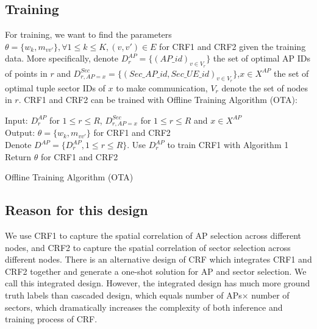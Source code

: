 \documentclass[conference]{IEEEtran}
\begin{document}
\subsection{Training}
For training, we want to find the parameters $\theta = \{w_{k},m_{vv'}\},\forall 1\leq k\leq K, (v,v')\in E$ for CRF1 and CRF2 given the training data. More specifically, denote $D^{AP}_{r}=\{(AP\_id)_{v\in V_{r}}\}$ the set of optimal AP IDs of points in $r$ and $D^{Sec}_{r,AP=x}=\{(Sec\_AP\_id, Sec\_UE\_id)_{v\in V_{r}}\}$,$x\in X^{AP}$ the set of optimal tuple sector IDs of $x$ to make communication, $V_{r}$ denote the set of nodes in $r$. CRF1 and CRF2 can be trained with Offline Training Algorithm (OTA):
\begin{algorithm}[H]
	Input:  $D^{AP}_{r}$ for $1\leq r\leq R$, $D^{Sec}_{r,AP=x}$ for $1\leq r\leq R$ and $x\in X^{AP}$\\
	Output: $\theta = \{w_{k},m_{vv'}\}$ for CRF1 and CRF2\\
    Denote $D^{AP}=\{D^{AP}_{r},1\leq r\leq R\}$. Use $D^{AP}_{r}$ to train CRF1 with Algorithm 1\\
    Return $\theta$ for CRF1 and CRF2
	\caption{Offline Training Algorithm (OTA)}
\end{algorithm}
\subsection{Reason for this design}
We use CRF1 to capture the spatial correlation of AP selection across different nodes, and CRF2 to capture the spatial correlation of sector selection across different nodes. There is an alternative design of CRF which integrates CRF1 and CRF2 together and generate a one-shot solution for AP and sector selection. We call this integrated design. However, the integrated design has much more ground truth labels than cascaded design, which equals number of APs$\times$ number of sectors, which dramatically increases the complexity of both inference and training process of CRF.  
\end{document}
